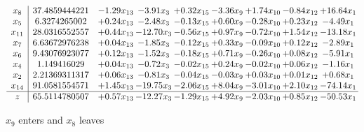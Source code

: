 \documentclass[9pt]{article}
\begin{document}
 \[\begin{array}{c| c c@{\hskip 2pt} c@{\hskip 2pt} c@{\hskip 2pt} c@{\hskip 2pt} c@{\hskip 2pt} c@{\hskip 2pt} c@{\hskip 2pt} }
 x_{8}   &  37.4859444221 & -1.29 x_{13} & -3.91 x_{3} & +  0.32 x_{15} & -3.36 x_{9} & +  1.74 x_{10} & -0.84 x_{12} & + 16.64 x_{1}\\
 x_{5}   &  6.3274265002 & +  0.24 x_{13} & -2.48 x_{3} & -0.13 x_{15} & +  0.60 x_{9} & -0.28 x_{10} & +  0.23 x_{12} & -4.49 x_{1}\\
 x_{11}   &  28.0316552557 & +  0.44 x_{13} & -12.70 x_{3} & -0.56 x_{15} & +  0.97 x_{9} & -0.72 x_{10} & +  1.54 x_{12} & -13.18 x_{1}\\
 x_{7}   &  6.63672976238 & +  0.04 x_{13} & -1.85 x_{3} & -0.12 x_{15} & +  0.33 x_{9} & -0.09 x_{10} & +  0.12 x_{12} & -2.89 x_{1}\\
 x_{6}   &  9.43076923077 & +  0.12 x_{13} & -1.52 x_{3} & -0.18 x_{15} & +  0.71 x_{9} & -0.26 x_{10} & +  0.08 x_{12} & -5.91 x_{1}\\
 x_{4}   &  1.149416029 & +  0.04 x_{13} & -0.72 x_{3} & -0.02 x_{15} & +  0.24 x_{9} & -0.02 x_{10} & +  0.06 x_{12} & -1.16 x_{1}\\
 x_{2}   &  2.21369311317 & +  0.06 x_{13} & -0.81 x_{3} & -0.04 x_{15} & -0.03 x_{9} & +  0.03 x_{10} & +  0.01 x_{12} & +  0.68 x_{1}\\
 x_{14}   &  91.0581554571 & +  1.45 x_{13} & -19.75 x_{3} & -2.06 x_{15} & +  8.04 x_{9} & -3.01 x_{10} & +  2.10 x_{12} & -74.14 x_{1}\\
\hline
z    &  65.5114780507 & +  0.57 x_{13} & -12.27 x_{3} & -1.29 x_{15} & +  4.92 x_{9} & -2.03 x_{10} & +  0.85 x_{12} & -50.53 x_{1}\\
\end{array}\]


 $ x_{9} $ enters and $ x_{8} $ leaves 
\end{document}
